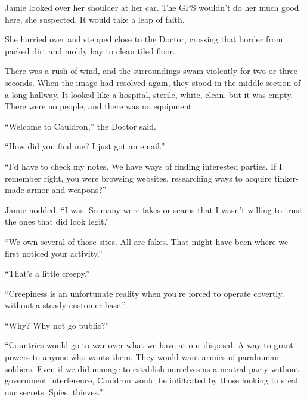 Jamie looked over her shoulder at her car.  The GPS wouldn't do her much good here, she suspected.  It would take a leap of faith.



She hurried over and stepped close to the Doctor, crossing that border from packed dirt and moldy hay to clean tiled floor.



There was a rush of wind, and the surroundings swam violently for two or three seconds.  When the image had resolved again, they stood in the middle section of a long hallway.  It looked like a hospital, sterile, white, clean, but it was empty.  There were no people, and there was no equipment.



``Welcome to Cauldron,'' the Doctor said.



\blacksquare



``How did you find me?  I just got an email.''



``I'd have to check my notes.  We have ways of finding interested parties.  If I remember right, you were browsing websites, researching ways to acquire tinker-made armor and weapons?''



Jamie nodded.  ``I was.  So many were fakes or scams that I wasn't willing to trust the ones that did look legit.''



``We own several of those sites.  All are fakes.  That might have been where we first noticed your activity.''



``That's a little creepy.''



``Creepiness is an unfortunate reality when you're forced to operate covertly, without a steady customer base.''



``Why?  Why not go public?''



``Countries would go to war over what we have at our disposal.  A way to grant powers to anyone who wants them.  They would want armies of parahuman soldiers.  Even if we did manage to establish ourselves as a neutral party without government interference, Cauldron would be infiltrated by those looking to steal our secrets.  Spies, thieves.''



